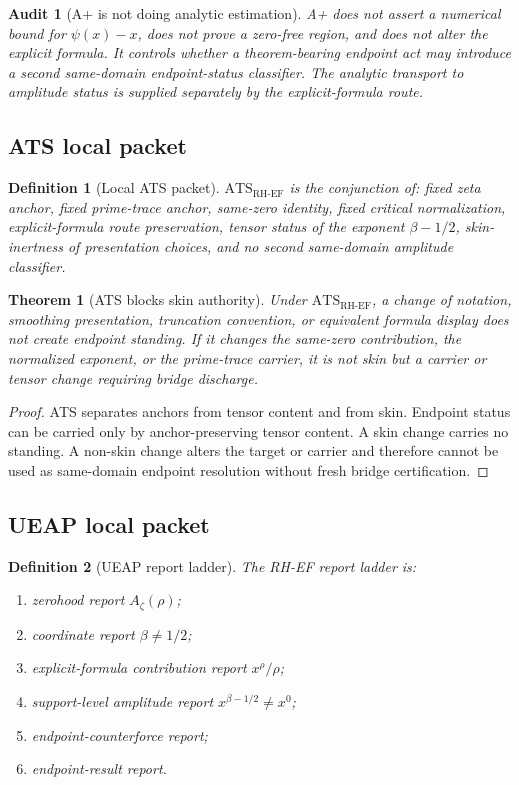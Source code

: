 \documentclass[11pt]{article}
\newtheorem{definition}{Definition}[section]
\newtheorem{theorem}{Theorem}[section]
\newtheorem{audit}{Audit}[section]
\newcommand{\Az}{A_{\zeta}}
\newcommand{\RH}{\mathrm{RH}}
\newcommand{\EF}{\mathrm{EF}}
\newcommand{\ATS}{\mathrm{ATS}}
\begin{document}
\begin{audit}[A+ is not doing analytic estimation]
A+ does not assert a numerical bound for \(\psi(x)-x\), does not prove a zero-free region, and does not alter the explicit formula.  It controls whether a theorem-bearing endpoint act may introduce a second same-domain endpoint-status classifier.  The analytic transport to amplitude status is supplied separately by the explicit-formula route.
\end{audit}

\subsection{ATS local packet}

\begin{definition}[Local ATS packet]
\(\ATS_{\RH\text{-}\EF}\) is the conjunction of: fixed zeta anchor, fixed prime-trace anchor, same-zero identity, fixed critical normalization, explicit-formula route preservation, tensor status of the exponent \(\beta-1/2\), skin-inertness of presentation choices, and no second same-domain amplitude classifier.
\end{definition}

\begin{theorem}[ATS blocks skin authority]
Under \(\ATS_{\RH\text{-}\EF}\), a change of notation, smoothing presentation, truncation convention, or equivalent formula display does not create endpoint standing.  If it changes the same-zero contribution, the normalized exponent, or the prime-trace carrier, it is not skin but a carrier or tensor change requiring bridge discharge.
\end{theorem}

\begin{proof}
ATS separates anchors from tensor content and from skin.  Endpoint status can be carried only by anchor-preserving tensor content.  A skin change carries no standing.  A non-skin change alters the target or carrier and therefore cannot be used as same-domain endpoint resolution without fresh bridge certification.
\end{proof}

\subsection{UEAP local packet}

\begin{definition}[UEAP report ladder]
The RH-EF report ladder is:
\begin{enumerate}
\item zerohood report \(\Az(\rho)\);
\item coordinate report \(\beta\ne 1/2\);
\item explicit-formula contribution report \(x^\rho/\rho\);
\item support-level amplitude report \(x^{\beta-1/2}\ne x^0\);
\item endpoint-counterforce report;
\item endpoint-result report.
\end{enumerate}
\end{definition}
\end{document}
